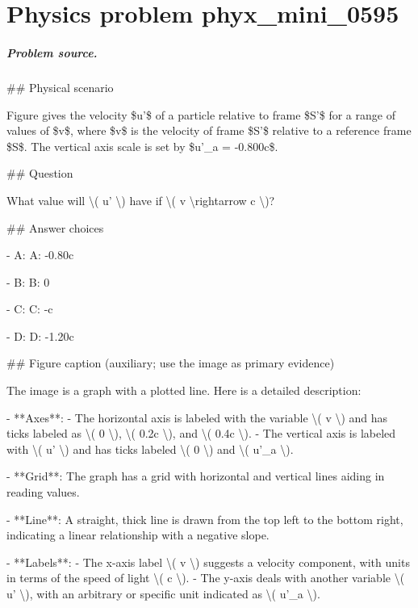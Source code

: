 
\chapter{Physics problem phyx\_mini\_0595}
\label{ch:PhyXMiniProblems_problem_phyx_mini_0595}

\paragraph{Problem source.}
\#\# Physical scenario

Figure gives the velocity \$u'\$ of a particle relative to frame \$S'\$ for a range of values of \$v\$, where \$v\$ is the velocity of frame \$S'\$ relative to a reference frame \$S\$. The vertical axis scale is set by \$u'\_a = -0.800c\$.

\#\# Question

What value will \textbackslash{}( u' \textbackslash{}) have if \textbackslash{}( v \textbackslash{}rightarrow c \textbackslash{})?

\#\# Answer choices

- A: A: -0.80c

- B: B: 0

- C: C: -c

- D: D: -1.20c

\#\# Figure caption (auxiliary; use the image as primary evidence)

The image is a graph with a plotted line. Here is a detailed description:

- **Axes**: 
  - The horizontal axis is labeled with the variable \textbackslash{}( v \textbackslash{}) and has ticks labeled as \textbackslash{}( 0 \textbackslash{}), \textbackslash{}( 0.2c \textbackslash{}), and \textbackslash{}( 0.4c \textbackslash{}).
  - The vertical axis is labeled with \textbackslash{}( u' \textbackslash{}) and has ticks labeled \textbackslash{}( 0 \textbackslash{}) and \textbackslash{}( u'\_a \textbackslash{}).

- **Grid**: The graph has a grid with horizontal and vertical lines aiding in reading values.

- **Line**: A straight, thick line is drawn from the top left to the bottom right, indicating a linear relationship with a negative slope.

- **Labels**: 
  - The x-axis label \textbackslash{}( v \textbackslash{}) suggests a velocity component, with units in terms of the speed of light \textbackslash{}( c \textbackslash{}).
  - The y-axis deals with another variable \textbackslash{}( u' \textbackslash{}), with an arbitrary or specific unit indicated as \textbackslash{}( u'\_a \textbackslash{}).

